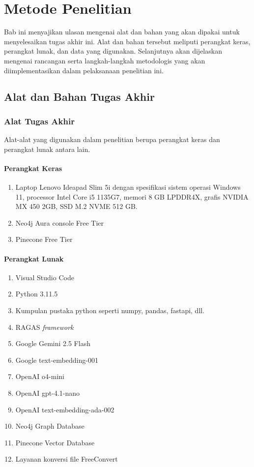 \chapter{Metode Penelitian}

Bab ini menyajikan ulasan mengenai alat dan bahan yang akan dipakai untuk menyelesaikan tugas akhir ini.
Alat dan bahan tersebut meliputi perangkat keras, perangkat lunak, dan data yang digunakan.
Selanjutnya akan dijelaskan mengenai rancangan serta langkah-langkah metodologis yang akan diimplementasikan dalam pelaksanaan penelitian ini.

\section{Alat dan Bahan Tugas Akhir}

\subsection{Alat Tugas Akhir}
Alat-alat yang digunakan dalam penelitian berupa perangkat keras dan perangkat lunak antara lain.
\subsubsection{Perangkat Keras}
\begin{enumerate}
	\item Laptop Lenovo Ideapad Slim 5i dengan spesifikasi sistem operasi Windows 11, processor Intel Core i5 1135G7, memori 8 GB LPDDR4X, grafis NVIDIA MX 450 2GB, SSD M.2 NVME 512 GB.
	\item Neo4j Aura console Free Tier
	\item Pinecone Free Tier
\end{enumerate}

\subsubsection{Perangkat Lunak}
\begin{enumerate}
	\item Visual Studio Code
	\item Python 3.11.5
	\item Kumpulan pustaka python seperti numpy, pandas, fastapi, dll.
	\item RAGAS \textit{framework}
	\item Google Gemini 2.5 Flash
	\item Google text-embedding-001
	\item OpenAI o4-mini
	\item OpenAI gpt-4.1-nano
	\item OpenAI text-embedding-ada-002
	\item Neo4j Graph Database
	\item Pinecone Vector Database
	\item Layanan konversi file FreeConvert
\end{enumerate}

